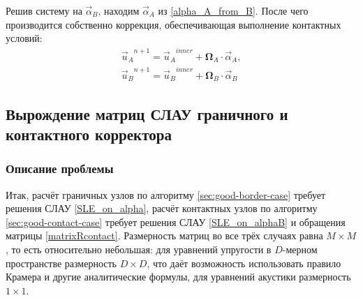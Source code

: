 \documentclass[a4paper]{article}
\numberwithin{equation}{section}
\begin{document}
Решив систему на $\vec{\alpha}_B$, находим $\vec{\alpha}_A$ из \eqref{alpha_A_from_B}. 
После чего производится собственно коррекция, обеспечивающая выполнение контактных условий:
\begin{eqnarray}
{\vec{u}_A}^{n+1} = {\vec{u}_A}^{inner} + \mathbf{\Omega}_A \cdot \vec{\alpha}_A, \\
{\vec{u}_B}^{n+1} = {\vec{u}_B}^{inner} + \mathbf{\Omega}_B \cdot \vec{\alpha}_B
\end{eqnarray}


\subsection{Вырождение матриц СЛАУ граничного и контактного корректора}
\subsubsection{Описание проблемы}
\label{degeneration_problem}
Итак, расчёт граничных узлов по алгоритму \ref{sec:good-border-case} 
требует решения СЛАУ \ref{SLE_on_alpha}, 
расчёт контактных узлов по алгоритму \ref{sec:good-contact-case} требует 
решения СЛАУ \ref{SLE_on_alphaB} и обращения матрицы \ref{matrixRcontact}.
Размерность матриц во все трёх случаях равна $M \times M$, 
то есть относительно небольшая: для уравнений упругости в $D$-мерном 
пространстве размерность $D \times D$, что даёт возможность 
использовать правило Крамера и другие аналитические формулы, 
для уравнений акустики размерность $1 \times 1$. 
\end{document}
